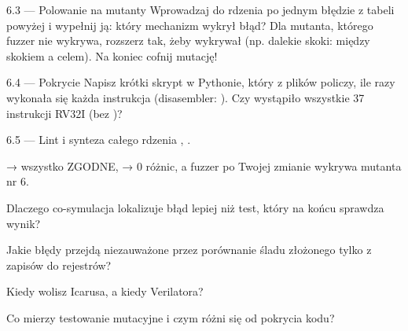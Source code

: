 \begin{zadanie}{6.3 --- Polowanie na mutanty}
Wprowadzaj do rdzenia po jednym błędzie z tabeli powyżej i wypełnij ją: który
mechanizm wykrył błąd? Dla mutanta, którego fuzzer nie wykrywa, rozszerz
 tak, żeby wykrywał (np. dalekie skoki:  między
skokiem a celem). Na koniec cofnij mutację!
\end{zadanie}

\begin{zadanie}{6.4 --- Pokrycie}
Napisz krótki skrypt w Pythonie, który z plików 
policzy, ile razy wykonała się każda instrukcja (disasembler:
). Czy wystąpiło wszystkie 37 instrukcji RV32I (bez
)?
\end{zadanie}

\begin{zadanie}{6.5 --- Lint i synteza całego rdzenia}
, .
\end{zadanie}

\begin{gotowe}
 → wszystko ZGODNE,  → 0 różnic, a
fuzzer po Twojej zmianie wykrywa mutanta nr 6.
\end{gotowe}

\begin{kontrolne}
  \item Dlaczego co-symulacja lokalizuje błąd lepiej niż test, który na końcu sprawdza wynik?
  \item Jakie błędy przejdą niezauważone przez porównanie śladu złożonego tylko z zapisów do rejestrów?
  \item Kiedy wolisz Icarusa, a kiedy Verilatora?
  \item Co mierzy testowanie mutacyjne i czym różni się od pokrycia kodu?
\end{kontrolne}
